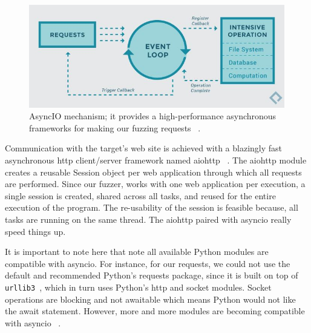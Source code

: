 \begin{figure}[ht]
 \centering
 \includegraphics[width=4.4in]{figures/asyncio_process.jpg}
 \caption{AsyncIO mechanism; it provides a high-performance asynchronous frameworks for making our fuzzing requests ~\cite{asyncio_image_source}.}
 \label{fig:asyncio_image_source}
\end{figure}

Communication with the target's web site is achieved with a blazingly fast asynchronous http client/server framework named aiohttp ~\cite{aiohttp}. The aiohttp module creates a reusable Session object per web application through which all requests are performed. Since our fuzzer, works with one web application per execution, a single session is created, shared across all tasks, and reused for the entire execution of the program. The re-usability of the session is feasible because, all tasks are running on the same thread. The aiohttp paired with asyncio really speed things up.

It is important to note here that note all available Python modules are compatible with asyncio. For instance, for our requests, we could not use the default and recommended Python's requests package, since it is built on top of {\tt urllib3 }, which in turn uses Python's http and socket modules. Socket operations are blocking and not awaitable which means Python would not like the await statement. However, more and more modules are becoming compatible with asyncio ~\cite{aiohttp}.

